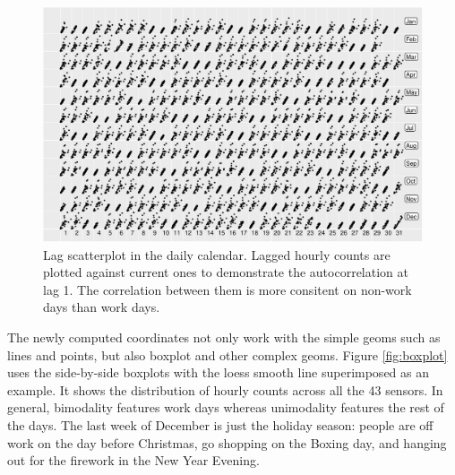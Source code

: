 \documentclass[article]{jss}
\begin{document}
\begin{CodeChunk}
\begin{figure}

{\centering \includegraphics[width=\textwidth]{figure/scatterplot-1} 

}

\caption[Lag scatterplot in the daily calendar]{Lag scatterplot in the daily calendar. Lagged hourly counts are plotted against current ones to demonstrate the autocorrelation at lag 1. The correlation between them is more consitent on non-work days than work days.}\label{fig:scatterplot}
\end{figure}
\end{CodeChunk}

The newly computed coordinates not only work with the simple geoms such
as lines and points, but also boxplot and other complex geoms. Figure
\ref{fig:boxplot} uses the side-by-side boxplots with the loess smooth
line superimposed as an example. It shows the distribution of hourly
counts across all the 43 sensors. In general, bimodality features work
days whereas unimodality features the rest of the days. The last week of
December is just the holiday season: people are off work on the day
before Christmas, go shopping on the Boxing day, and hanging out for the
firework in the New Year Evening.
\end{document}
